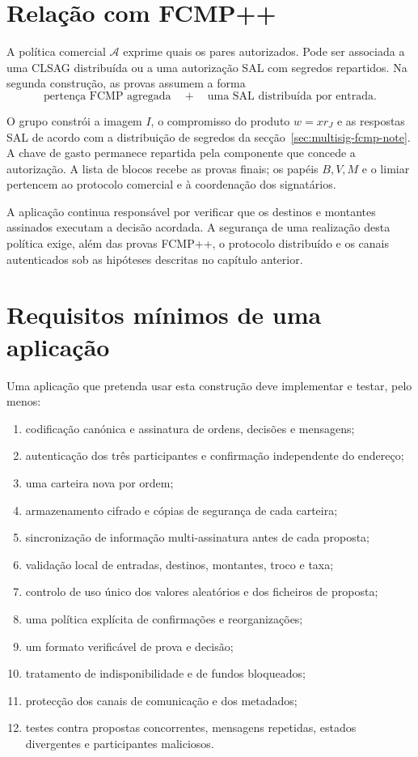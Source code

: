 \section{Relação com FCMP++}
\label{sec:escrow-fcmp}

A política comercial \(\mathcal A\) exprime quais os pares autorizados.
Pode ser associada a uma CLSAG distribuída ou a uma autorização SAL com
segredos repartidos. Na segunda construção, as provas assumem a forma
\[
 \text{pertença FCMP agregada}
 \quad+\quad
 \text{uma SAL distribuída por entrada}.
\]

O grupo constrói a imagem \(I\), o compromisso do produto \(w=xr_J\) e as
respostas SAL de acordo com a distribuição de segredos da
secção~\ref{sec:multisig-fcmp-note}. A chave de gasto permanece repartida
pela componente que concede a autorização. A lista de blocos recebe as
provas finais; os papéis \(B,V,M\) e o limiar pertencem ao protocolo
comercial e à coordenação dos signatários.

A aplicação continua responsável por verificar que os destinos e montantes
assinados executam a decisão acordada. A segurança de uma realização desta
política exige, além das provas FCMP++, o protocolo distribuído e os canais
autenticados sob as hipóteses descritas no capítulo anterior.

\section{Requisitos mínimos de uma aplicação}
\label{sec:escrow-application-requirements}

Uma aplicação que pretenda usar esta construção deve implementar e testar,
pelo menos:

\begin{enumerate}
 \item codificação canónica e assinatura de ordens, decisões e mensagens;
 \item autenticação dos três participantes e confirmação independente do
 endereço;
 \item uma carteira nova por ordem;
 \item armazenamento cifrado e cópias de segurança de cada carteira;
 \item sincronização de informação multi-assinatura antes de cada proposta;
 \item validação local de entradas, destinos, montantes, troco e taxa;
 \item controlo de uso único dos valores aleatórios e dos ficheiros de
 proposta;
 \item uma política explícita de confirmações e reorganizações;
 \item um formato verificável de prova e decisão;
 \item tratamento de indisponibilidade e de fundos bloqueados;
 \item protecção dos canais de comunicação e dos metadados;
 \item testes contra propostas concorrentes, mensagens repetidas, estados
 divergentes e participantes maliciosos.
\end{enumerate}


